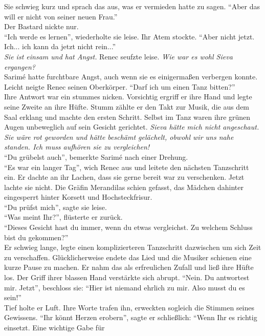 Sie schwieg kurz und sprach das aus, was er vermieden hatte zu sagen. ``Aber das will er nicht von 
seiner neuen Frau.''\\
Der Bastard nickte nur.\\
``Ich werde es lernen'', wiederholte sie leise. Ihr Atem stockte. ``Aber nicht jetzt. Ich... ich 
kann da jetzt nicht rein...''\\
\textit{Sie ist einsam und hat Angst.} Renec seufzte leise. \textit{Wie war es wohl Sieva 
ergangen?}\\
Sarimé hatte furchtbare Angst, auch wenn sie es einigermaßen verbergen konnte. Leicht neigte Renec 
seinen Oberkörper. ``Darf ich um einen Tanz bitten?''\\
Ihre Antwort war ein stummes nicken. Vorsichtig ergriff er ihre Hand und legte seine Zweite an ihre 
Hüfte. Stumm zählte er den Takt zur Musik, die aus dem Saal erklang und machte den ersten Schritt. 
Selbst im Tanz waren ihre grünen Augen unbeweglich auf sein Gesicht gerichtet. \textit{Sieva 
hätte mich nicht angeschaut. Sie wäre rot geworden und hätte beschämt gelächelt, obwohl wir uns 
nahe standen. Ich muss aufhören sie zu vergleichen!}\\
``Du grübelst auch'', bemerkte Sarimé nach einer Drehung.\\
``Es war ein langer Tag'', wich Renec aus und leitete den nächsten Tanzschritt ein. Er dachte an 
ihr Lachen, dass sie gerne bereit war zu verschenken. Jetzt lachte sie nicht. Die Gräfin Merandilas 
schien gefasst, das Mädchen dahinter eingesperrt hinter Korsett und Hochsteckfrisur. \\
``Du prüfst mich'', sagte sie leise.\\
``Was meint Ihr?'', flüsterte er zurück.\\
``Dieses Gesicht hast du immer, wenn du etwas vergleichst. Zu welchem Schluss bist du gekommen?''\\
Er schwieg lange, legte einen komplizierteren Tanzschritt dazwischen um sich Zeit zu verschaffen. 
Glücklicherweise endete das Lied und die Musiker schienen eine kurze Pause zu machen. Er nahm das 
als erfreulichen Zufall und ließ ihre Hüfte los. Der Griff ihrer blassen Hand verstärkte sich 
abrupt. ``Nein. Du antwortest mir. Jetzt'', beschloss sie: ``Hier ist niemand ehrlich zu mir. Also 
musst du es sein!''\\
Tief holte er Luft. Ihre Worte trafen ihn, erweckten sogleich die Stimmen seines Gewissens. ``Ihr 
könnt Herzen erobern'', sagte er schließlich: ``Wenn Ihr es richtig einsetzt. Eine wichtige Gabe für 
